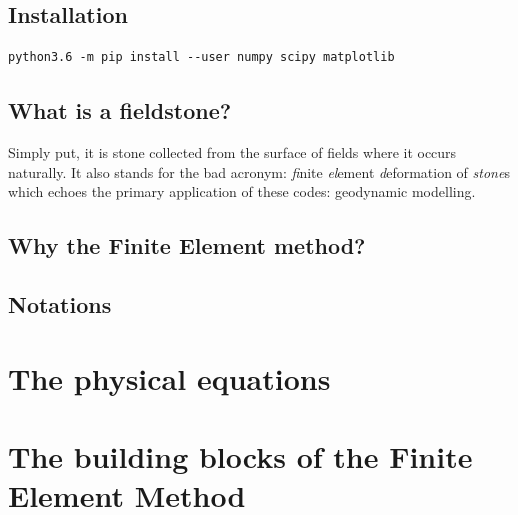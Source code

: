 \documentclass[a4paper]{article}
\begin{document}
\subsection{Installation}

\begin{verbatim}
python3.6 -m pip install --user numpy scipy matplotlib
\end{verbatim}

\subsection{What is a fieldstone?} %
Simply put, it is stone collected from the surface of fields where it 
occurs naturally. It also stands for the bad acronym: {\sl fi}nite 
{\sl el}ement {\sl d}eformation of {\sl stone}s which echoes the primary 
application of these codes: geodynamic modelling.

\subsection{Why the Finite Element method?}  %

\subsection{Notations}  %


\newpage
\section{The physical equations} %

\newpage
\section{The building blocks of the Finite Element Method} %
\end{document}
